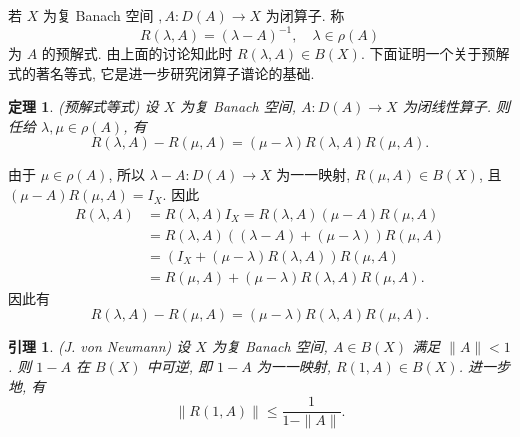 \documentclass[openany]{ctexbook}
\makeatletter
\theoremstyle{kaiti}
\newtheorem{theorem}{定理}[section]
\newtheorem{lemma}{引理}[section]
\theoremstyle{normal}
\renewenvironment{proof}[1][\proofname]{\par
    \pushQED{\qed}%
    \normalfont \topsep6\p@\@plus6\p@\relax
    \trivlist
    \item\relax
    {\heiti #1}\hspace{2\labelsep}\ignorespaces
  }{%
    \popQED\endtrivlist\@endpefalse
  }
\makeatother
\begin{document}
若 $X$ 为复 Banach 空间 $, A: D(A) \rightarrow X$ 为闭算子. 称
$$
R(\lambda, A)=(\lambda-A)^{-1}, \quad \lambda \in \rho(A)
$$
为 $A$ 的预解式. 由上面的讨论知此时 $R(\lambda, A) \in B(X)$. 下面证明一个关于预解式的著名等式, 它是进一步研究闭算子谱论的基础.

\begin{theorem}
(预解式等式) 设 $X$ 为复 Banach 空间, $A: D(A) \rightarrow X$ 为闭线性算子. 则任给 $\lambda, \mu \in \rho(A)$, 有
$$
R(\lambda, A)-R(\mu, A)=(\mu-\lambda) R(\lambda, A) R(\mu, A).
$$
\end{theorem}

\begin{proof}
由于 $\mu \in \rho(A)$, 所以 $\lambda-A: D(A) \rightarrow X$ 为一一映射, $R(\mu, A) \in B(X)$, 且 $(\mu-A) R(\mu, A)=I_{X}$. 因此
$$
\begin{aligned}
R(\lambda, A) &=R(\lambda, A) I_{X}=R(\lambda, A)(\mu-A) R(\mu, A) \\
&=R(\lambda, A)((\lambda-A)+(\mu-\lambda)) R(\mu, A) \\
&=\left(I_{X}+(\mu-\lambda) R(\lambda, A)\right) R(\mu, A) \\
&=R(\mu, A)+(\mu-\lambda) R(\lambda, A) R(\mu, A).
\end{aligned}
$$
因此有
$$
R(\lambda, A)-R(\mu, A)=(\mu-\lambda) R(\lambda, A) R(\mu, A).
$$
\end{proof}

\begin{lemma}
(J. von Neumann) 设 $X$ 为复 Banach 空间, $A \in B(X)$ 满足 $\|A\|<1$. 则 $1-A$ 在 $B(X)$ 中可逆, 即 $1-A$ 为一一映射, $R(1, A) \in B(X)$. 进一步地, 有
$$
\|R(1, A)\| \leqslant \frac{1}{1-\|A\|}.
$$
\end{lemma}
\end{document}
